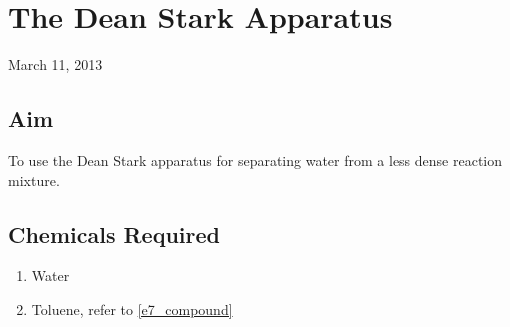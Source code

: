 \chapter{The Dean Stark Apparatus}
\begin{flushright}
March 11, 2013
\end{flushright}
\section{Aim}
To use the Dean Stark apparatus for separating water from a less dense reaction mixture.

\section {Chemicals Required}


	\begin{enumerate}
		\item Water
		\item Toluene, refer to \autoref{e7_compound}
	\end{enumerate}


